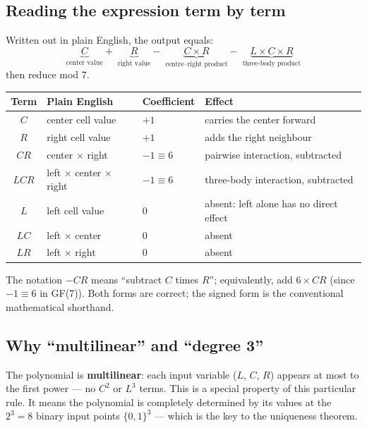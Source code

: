 \documentclass[11pt,a4paper]{article}
\newcommand{\term}[1]{\textbf{#1}}
\begin{document}
\subsection{Reading the expression term by term}

Written out in plain English, the output equals:
\[
  \underbrace{C}_{\text{center value}}
  +\;\underbrace{R}_{\text{right value}}
  -\;\underbrace{C \times R}_{\text{centre--right product}}
  -\;\underbrace{L \times C \times R}_{\text{three-body product}}
\]
then reduce mod 7.

\bigskip
\begin{center}
\begin{tabular}{clll}
\toprule
Term & Plain English & Coefficient & Effect \\
\midrule
$C$   & center cell value & $+1$ & carries the center forward \\
$R$   & right cell value  & $+1$ & adds the right neighbour \\
$CR$  & center $\times$ right & $-1\equiv 6$ & pairwise interaction, subtracted \\
$LCR$ & left $\times$ center $\times$ right & $-1\equiv 6$ & three-body interaction, subtracted \\
\midrule
$L$   & left cell value   & $0$  & absent: left alone has no direct effect \\
$LC$  & left $\times$ center & $0$ & absent \\
$LR$  & left $\times$ right  & $0$ & absent \\
\bottomrule
\end{tabular}
\end{center}

\bigskip
\noindent
The notation $-CR$ means ``subtract $C$ times $R$''; equivalently, add
$6 \times CR$ (since $-1 \equiv 6$ in GF(7)).  Both forms are correct; the
signed form is the conventional mathematical shorthand.

\subsection{Why ``multilinear'' and ``degree 3''}

The polynomial is \term{multilinear}: each input variable ($L$, $C$, $R$)
appears at most to the first power — no $C^2$ or $L^3$ terms.  This is a
special property of this particular rule.  It means the polynomial is
completely determined by its values at the $2^3 = 8$ binary input points
$\{0,1\}^3$ — which is the key to the uniqueness theorem.
\end{document}
